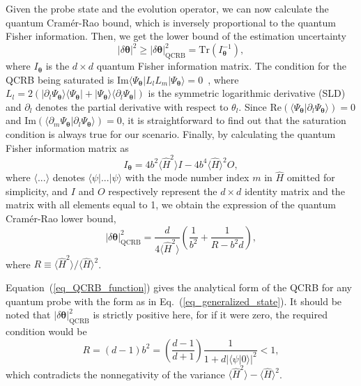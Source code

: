 \documentclass[aps,pra,reprint,showpacs,groupedaddress]{revtex4-1}
\begin{document}
Given the probe state and the evolution operator, we can now calculate the quantum Cram\'er-Rao bound, which is inversely proportional to the quantum Fisher information.  Then, we get the lower bound of the estimation uncertainty
\begin{equation}
    |\delta\boldsymbol{\theta}|^2
    \geq
    |\delta\boldsymbol{\theta}|_{\text{QCRB}}^2
    =
    \text{Tr}(I_{\boldsymbol{\theta}}^{-1}),
\end{equation}
where $I_{\boldsymbol{\theta}}$ is the $d\times d$ quantum Fisher information matrix.
The condition for the QCRB being saturated is $\text{Im}\langle\Psi_{\boldsymbol{\theta}}| L_l L_m |\Psi_{\boldsymbol{\theta}}\rangle=0$~\cite{Matsumoto2002_QCRB_condition_pure}, where $L_l=2\left(|\partial_l\Psi_{\boldsymbol{\theta}}\rangle\langle\Psi_{\boldsymbol{\theta}}| + |\Psi_{\boldsymbol{\theta}}\rangle \langle\partial_l \Psi_{\boldsymbol{\theta}}|\right)$ is the symmetric logarithmic derivative (SLD) and $\partial_l$ denotes the partial derivative with respect to $\theta_l$. Since $\text{Re}\left(\langle\Psi_{\boldsymbol{\theta}}|\partial_l\Psi_{\boldsymbol{\theta}}\rangle\right)=0$ and $\text{Im}\left(\langle\partial_m\Psi_{\boldsymbol{\theta}}|\partial_l\Psi_{\boldsymbol{\theta}}\rangle\right)=0$, it is straightforward to find out that the saturation condition is always true for our scenario.
Finally, by calculating the quantum Fisher information matrix as~\cite{Paris2009_QFIMatrix}
\begin{equation}
    I_{\boldsymbol{\theta}}=4 b^2\langle \hat{H}^2 \rangle I - 4 b^4 \langle \hat{H} \rangle^2 O,
\end{equation}
where $\langle...\rangle$ denotes $\langle\psi|...|\psi\rangle$ with the mode number index $m$ in $\hat{H}$ omitted for simplicity, and $I$ and $O$ respectively represent the $d\times d$ identity matrix and the matrix with all elements equal to 1, we obtain the expression of the quantum Cram\'{e}r-Rao lower bound,
\begin{equation}
    |\delta\boldsymbol{\theta}|_{\text{QCRB}}^2
    =
    \frac{d}{4 \langle \hat{H}^2 \rangle}
    \left(\frac{1}{b^2}+\frac{1}{R - b^2 d}\right) ,
    \label{eq_QCRB_function}
\end{equation}
where $R \equiv \langle \hat{H}^2 \rangle / \langle \hat{H} \rangle^2$.

Equation~(\ref{eq_QCRB_function}) gives the analytical form of the QCRB for any quantum probe with the form as in Eq.~(\ref{eq_generalized_state}).  It should be noted that $|\delta\boldsymbol{\theta}|_{\text{QCRB}}^2$ is strictly positive here, for if it were zero, the required condition would be
\begin{equation}
    R = (d-1)b^2
    = \left(\frac{d-1}{d+1}\right) \frac{1}{1+d|\langle \psi|0\rangle|^2} < 1 ,
\end{equation}
which contradicts the nonnegativity of the variance $\langle \hat{H}^2 \rangle - \langle \hat{H} \rangle^2$.
\end{document}
